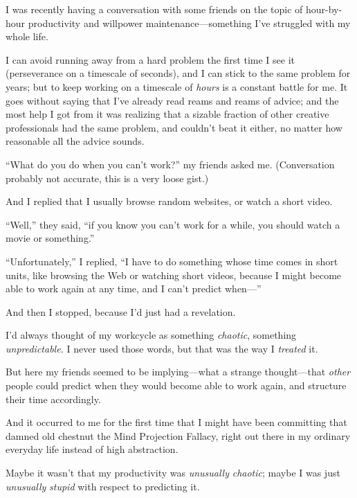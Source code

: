 \myendsectiontext


{
 I was recently having a conversation with some friends on the
topic of hour-by-hour productivity and willpower
maintenance---something I've struggled with my whole
life. }

{
 I can avoid running away from a hard problem the first time I see
it (perseverance on a timescale of seconds), and I can stick to the
same problem for years; but to keep working on a timescale of
\textit{hours} is a constant battle for me. It goes without saying that
I've already read reams and reams of advice; and the
most help I got from it was realizing that a sizable fraction of other
creative professionals had the same problem, and
couldn't beat it either, no matter how reasonable all
the advice sounds.}

{
 ``What do you do when you can't
work?'' my friends asked me. (Conversation probably
not accurate, this is a very loose gist.)}

{
 And I replied that I usually browse random websites, or watch a
short video.}

{
 ``Well,'' they said,
``if you know you can't work for a
while, you should watch a movie or something.''}

{
 ``Unfortunately,'' I replied,
``I have to do something whose time comes in short
units, like browsing the Web or watching short videos, because I might
become able to work again at any time, and I can't
predict when---''}

{
 And then I stopped, because I'd just had a
revelation.}

{
 I'd always thought of my workcycle as something
\textit{chaotic}, something \textit{unpredictable.} I never used those
words, but that was the way I \textit{treated} it.}

{
 But here my friends seemed to be implying---what a strange
thought---that \textit{other} people could predict when they would
become able to work again, and structure their time accordingly.}

{
 And it occurred to me for the first time that I might have been
committing that damned old chestnut the Mind Projection Fallacy, right
out there in my ordinary everyday life instead of high abstraction.}

{
 Maybe it wasn't that my productivity was
\textit{unusually} \textit{chaotic}; maybe I was just
\textit{unusually} \textit{stupid} with respect to predicting it.}

